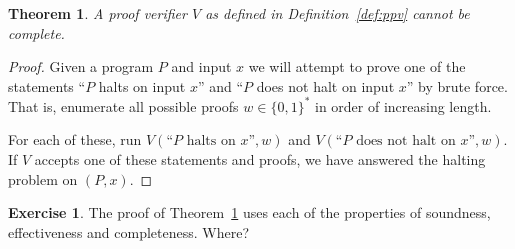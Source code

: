 \documentclass[11pt]{article}
\newif\ifsolutions
\newtheorem{theorem}{Theorem}
\theoremstyle{definition}
\newtheorem{exercise}{Exercise}
\newtheorem*{solution}{Solution}
\theoremstyle{remark}
\begin{document}
\begin{theorem}
  \label{thm:incomplete}
  A proof verifier $V$ as defined in Definition~\ref{def:ppv} cannot
  be complete.
\end{theorem}
\begin{proof}
  Given a program $P$ and input $x$ we will attempt to prove one of
  the statements ``$P$ halts on input $x$'' and ``$P$ does not halt on
  input $x$'' by brute force. That is, enumerate all possible proofs
  $w \in \{0,1\}^*$ in order of increasing length.

  For each of these, run $V(\text{``$P$ halts on $x$''}, w)$ and
  $V(\text{``$P$ does not halt on $x$''}, w)$. If $V$ accepts one of
  these statements and proofs, we have answered the halting problem on
  $(P, x)$.
\end{proof}

\begin{exercise}
  The proof of Theorem~\ref{thm:incomplete} uses each of the
  properties of soundness, effectiveness and completeness. Where?
\end{exercise}

\ifsolutions
\begin{solution}
  Soundness is used to tell us that we can ``trust'' the answer we get
  from $V$. If $V$ accepts a proof that $P(x)$ does/does not halt, we
  know that that particular statement is true. Effectiveness allows us
  to run the verifier $V$ on our proof strings. Completeness is used
  to assure us that that our procedure of enumerating all the proof
  strings will eventually end and lead $V$ to accept one of the two
  statements. One of the statements that $P(x)$ halts or does not halt
  \emph{must} be true. Therefore if $V$ is complete, then there is
  proof $w$ that $V$ will accept for one of these statements. By
  enumerating all possible $w$ we will eventually find it.
\end{solution}
\else
\vspace{3in}
\fi
\end{document}
